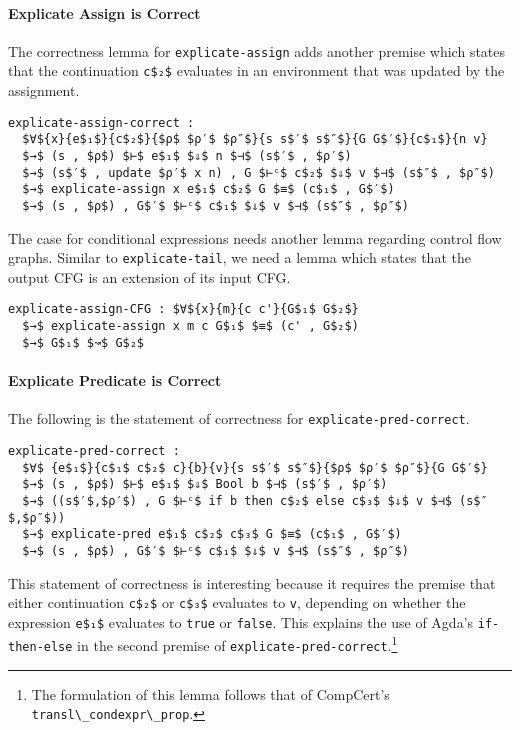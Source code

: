 \documentclass[sigplan,review,dvipsnames,screen,10pt]{acmart}
\begin{document}
\paragraph{Explicate Assign is Correct}

The correctness lemma for \lstinline{explicate-assign} adds another
premise which states that the continuation \lstinline{c$₂$} evaluates
in an environment that was updated by the assignment.

\begin{lstlisting}
explicate-assign-correct :
  $∀${x}{e$₁$}{c$₂$}{$ρ$ $ρ′$ $ρ″$}{s s$′$ s$″$}{G G$′$}{c$₁$}{n v}
  $→$ (s , $ρ$) $⊢$ e$₁$ $⇓$ n $⊣$ (s$′$ , $ρ′$)
  $→$ (s$′$ , update $ρ′$ x n) , G $⊢ᶜ$ c$₂$ $⇓$ v $⊣$ (s$″$ , $ρ″$)
  $→$ explicate-assign x e$₁$ c$₂$ G $≡$ (c$₁$ , G$′$)
  $→$ (s , $ρ$) , G$′$ $⊢ᶜ$ c$₁$ $⇓$ v $⊣$ (s$″$ , $ρ″$)
\end{lstlisting}

\noindent The case for conditional expressions needs another lemma
regarding control flow graphs. Similar to \lstinline{explicate-tail},
we need a lemma which states that the output CFG is an extension of
its input CFG.

\begin{lstlisting}
explicate-assign-CFG : $∀${x}{m}{c c'}{G$₁$ G$₂$}
  $→$ explicate-assign x m c G$₁$ $≡$ (c' , G$₂$)
  $→$ G$₁$ $↝$ G$₂$
\end{lstlisting}

\paragraph{Explicate Predicate is Correct}

The following is the statement of correctness for
\lstinline{explicate-pred-correct}.

\begin{lstlisting}
explicate-pred-correct :
  $∀$ {e$₁$}{c$₁$ c$₂$ c}{b}{v}{s s$′$ s$″$}{$ρ$ $ρ′$ $ρ″$}{G G$′$}
  $→$ (s , $ρ$) $⊢$ e$₁$ $⇓$ Bool b $⊣$ (s$′$ , $ρ′$)
  $→$ ((s$′$,$ρ′$) , G $⊢ᶜ$ if b then c$₂$ else c$₃$ $⇓$ v $⊣$ (s$″$,$ρ″$))
  $→$ explicate-pred e$₁$ c$₂$ c$₃$ G $≡$ (c$₁$ , G$′$)
  $→$ (s , $ρ$) , G$′$ $⊢ᶜ$ c$₁$ $⇓$ v $⊣$ (s$″$ , $ρ″$)
\end{lstlisting}

\noindent This statement of correctness is interesting because it
requires the premise that either continuation \lstinline{c$₂$} or
\lstinline{c$₃$} evaluates to \lstinline{v}, depending on whether the
expression \lstinline{e$₁$} evaluates to \lstinline{true} or
\lstinline{false}. This explains the use of Agda's
\lstinline{if-then-else} in the second premise of
\lstinline{explicate-pred-correct}.\footnote{The formulation of this
lemma follows that of CompCert's \lstinline{transl\_condexpr\_prop}.}
\end{document}
